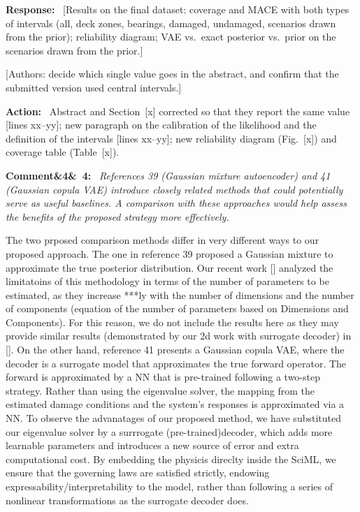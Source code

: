 \documentclass[11pt]{article}
\newenvironment{rcomment}[1]{\par\bigskip\noindent\textbf{Comment\ifx&#1&\else\ #1\fi:}\ \itshape}{\par}
\newenvironment{response}{\par\smallskip\noindent\color{resp}\textbf{Response:}\ }{\par}
\newenvironment{action}{\par\smallskip\noindent\color{resp}\textbf{Action:}\ }{\par}
\newcommand{\authornote}[1]{\textcolor{note}{\textsf{[Authors: #1]}}}
\newcommand{\tbd}[1]{\textcolor{note}{\textsf{[#1]}}}
\newcommand{\lines}[1]{\tbd{lines #1}}
\begin{document}
\begin{response}
\tbd{Results on the final dataset: coverage and MACE with both types of intervals (all, deck zones, bearings, damaged, undamaged,
scenarios drawn from the prior); reliability diagram; VAE vs.\ exact posterior vs.\ prior on the scenarios drawn from the prior.}
\end{response}
\authornote{decide which single value goes in the abstract, and confirm that the submitted version used central intervals.}

\begin{action}
Abstract and Section~\tbd{x} corrected so that they report the same value \lines{xx--yy}; new paragraph on the
calibration of the likelihood and the definition of the intervals \lines{xx--yy}; new reliability diagram (Fig.~\tbd{x})
and coverage table (Table~\tbd{x}).
\end{action}


\begin{rcomment}{4}
References 39 (Gaussian mixture autoencoder) and 41 (Gaussian copula VAE) introduce closely related methods that could
potentially serve as useful baselines. A comparison with these approaches would help assess the benefits of the proposed
strategy more effectively.
\end{rcomment}

The two prposed comparison methods differ in very different ways to our proposed approach. 
The one in reference 39 proposed a Gaussian mixture to approximate the true posterior distribution. 
Our recent work [] analyzed the limitatoins of this methodology in terms of the number of parameters to be estimated, as they increase ***ly with the number of dimensions and the number of components (equation of the number of parameters based on Dimensions and Components). For this reason, we do not include the results here as they may provide similar results (demonstrated by our 2d work with surrogate decoder) in []. 
On the other hand, reference 41 presents a Gaussian copula VAE, where the decoder is a surrogate model that approximates the true forward operator. 
The forward is approximated by a NN that is pre-trained following a two-step strategy. 
Rather than using the eigenvalue solver, the mapping from the estimated damage conditions and the system's responses is approximated via a NN. 
To observe the advanatages of our proposed method, we have substituted our eigenvalue solver by a surrrogate (pre-trained)decoder, which adds more learnable parameters and introduces a new source of error and extra computational cost. 
By embedding the physicis direclty inside the SciML, we ensure that the governing laws are satisfied strictly, endowing expressability/interpretability to the model, rather than following a series of nonlinear transformations as the surrogate decoder does.
\end{document}

